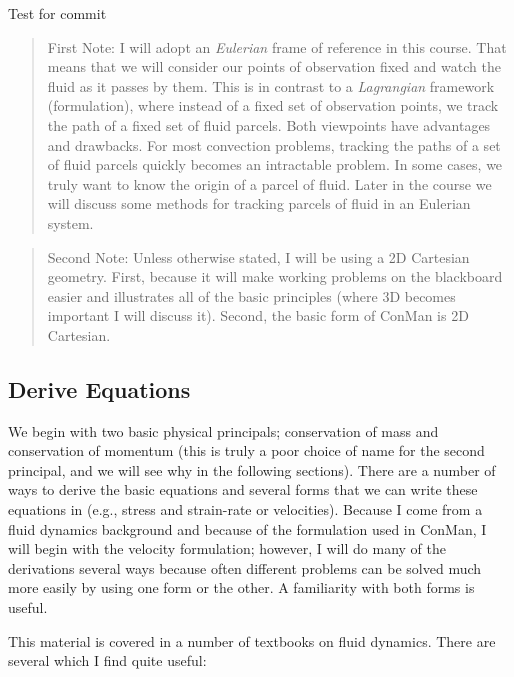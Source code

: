 \documentclass[12pt,twoside]{article}
\begin{document}
Test for commit

\begin{quotation} 
\noindent
First Note:  I will adopt an {\em Eulerian} frame of reference
in this course.  That means that we will consider our points of observation
fixed and watch the fluid as it passes by them.   This is in contrast to a {\em
Lagrangian} framework (formulation), where instead of a fixed set of observation
points, we track the path of a fixed set of fluid parcels.  Both viewpoints have
advantages and drawbacks.   For most convection problems, tracking the paths of
a set of fluid parcels quickly becomes an intractable problem.  In some cases,
we truly want to know the origin of a parcel of fluid.   Later in the course we
will discuss some methods for tracking parcels of fluid in an Eulerian system.
\end{quotation}
 
\begin{quotation} 
\noindent
Second Note:  Unless otherwise stated, I will be using a 2D
Cartesian geometry.  First, because it will make working problems on the
blackboard easier and illustrates all of the basic principles (where 3D becomes
important  I will discuss it).  Second, the basic form of ConMan is 2D Cartesian.
\end{quotation}

\subsection{Derive Equations}

We begin with two basic physical principals; conservation of mass and
conservation of momentum (this is truly a poor choice of name for the second
principal, and we will see why in the following sections).  There are a number
of ways to derive the basic equations and several forms that we can write these
equations in (e.g., stress and strain-rate or velocities).  Because I come from
a fluid dynamics background and because of the formulation used in ConMan, I
will begin with the velocity formulation; however, I will do many of the
derivations several ways because often different problems can be solved much
more easily by using one form or the other.   A familiarity with both forms is
useful.  

This material is covered in a number of textbooks on fluid dynamics.  There are
several which I find quite useful:
\end{document}
